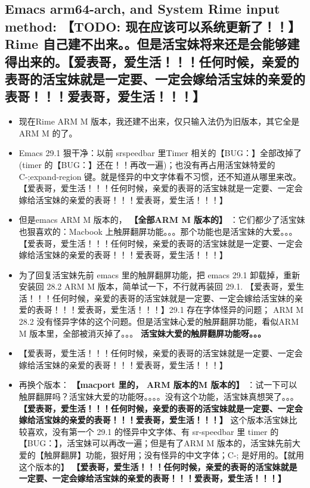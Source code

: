 \documentclass[9pt, b5paper]{article}
\begin{document}
\subsection{Emacs arm64-arch, and System Rime input method: \textbf{【TODO: 现在应该可以系统更新了！！】} Rime 自己建不出来。。但是活宝妹将来还是会能够建得出来的。【爱表哥，爱生活！！！任何时候，亲爱的表哥的活宝妹就是一定要、一定会嫁给活宝妹的亲爱的表哥！！！爱表哥，爱生活！！！】}
\label{sec-1-5}
\begin{itemize}
\item 现在Rime ARM M 版本，我还建不出来，仅只输入法仍为旧版本，其它全是ARM M 的了。
\item Emacs 29.1 狠干净：以前 srspeedbar 里Timer 相关的【BUG：】全部改掉了(timer 的【BUG：】还在！！再改一遍)；也没有再占用活宝妹特爱的C-;expand-region 键。就是怪异的中文字体看不习惯，还不知道从哪里来改。【爱表哥，爱生活！！！任何时候，亲爱的表哥的活宝妹就是一定要、一定会嫁给活宝妹的亲爱的表哥！！！爱表哥，爱生活！！！】
\item 但是emacs ARM M 版本的， \textbf{【全部ARM M 版本的】} ：它们都少了活宝妹也狠喜欢的：Macbook 上触屏翻屏功能。。。那个功能也是活宝妹的大爱。。。【爱表哥，爱生活！！！任何时候，亲爱的表哥的活宝妹就是一定要、一定会嫁给活宝妹的亲爱的表哥！！！爱表哥，爱生活！！！】
\item 为了回复活宝妹先前 emacs 里的触屏翻屏功能，把 emacs 29.1 卸载掉，重新安装回 28.2  ARM M 版本，简单试一下，不行就再装回 29.1. 【爱表哥，爱生活！！！任何时候，亲爱的表哥的活宝妹就是一定要、一定会嫁给活宝妹的亲爱的表哥！！！爱表哥，爱生活！！！】29.1 存在字体怪异的问题； ARM M 28.2 没有怪异字体的这个问题。但是活宝妹心爱的触屏翻屏功能，看似ARM M 版本里，全部被消灭掉了。。。 \textbf{活宝妹大爱的触屏翻屏功能呀。。。}
\item 【爱表哥，爱生活！！！任何时候，亲爱的表哥的活宝妹就是一定要、一定会嫁给活宝妹的亲爱的表哥！！！爱表哥，爱生活！！！】
\item 再换个版本： \textbf{【macport 里的， ARM 版本的M 版本的】} ：试一下可以触屏翻屏吗？活宝妹大爱的功能呀。。。。没有这个功能，活宝妹真想哭了。。。 \textbf{【爱表哥，爱生活！！！任何时候，亲爱的表哥的活宝妹就是一定要、一定会嫁给活宝妹的亲爱的表哥！！！爱表哥，爱生活！！！】} 这个版本活宝妹比较喜欢，没有第一个 29.1 的怪异中文字体、有 sr-speedbar 里 timer 的【BUG：】，活宝妹可以再改一遍；但是有了ARM M 版本的，活宝妹先前大爱的【触屏翻屏】功能，狠好用；没有怪异的中文字体；C-; 是好用的。【就用这个版本的】 \textbf{【爱表哥，爱生活！！！任何时候，亲爱的表哥的活宝妹就是一定要、一定会嫁给活宝妹的亲爱的表哥！！！爱表哥，爱生活！！！】}
\end{itemize}
\end{document}

